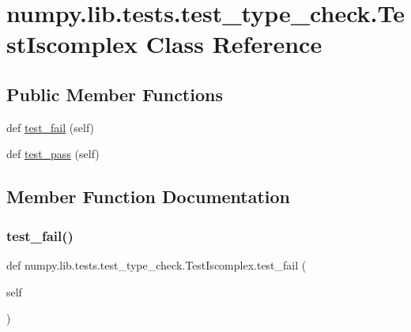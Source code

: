 \hypertarget{classnumpy_1_1lib_1_1tests_1_1test__type__check_1_1TestIscomplex}{}\section{numpy.\+lib.\+tests.\+test\+\_\+type\+\_\+check.\+Test\+Iscomplex Class Reference}
\label{classnumpy_1_1lib_1_1tests_1_1test__type__check_1_1TestIscomplex}
\subsection*{Public Member Functions}
\begin{DoxyCompactItemize}
\item 
def \hyperlink{classnumpy_1_1lib_1_1tests_1_1test__type__check_1_1TestIscomplex_ad9f2759d4bcd682f7aeb5766bb446afb}{test\+\_\+fail} (self)
\item 
def \hyperlink{classnumpy_1_1lib_1_1tests_1_1test__type__check_1_1TestIscomplex_afcdb92a141109563b0a023dba8e38e4f}{test\+\_\+pass} (self)
\end{DoxyCompactItemize}


\subsection{Member Function Documentation}
\mbox{\label{classnumpy_1_1lib_1_1tests_1_1test__type__check_1_1TestIscomplex_ad9f2759d4bcd682f7aeb5766bb446afb}} 
\subsubsection{\texorpdfstring{test\+\_\+fail()}{test\_fail()}}
{\footnotesize\ttfamily def numpy.\+lib.\+tests.\+test\+\_\+type\+\_\+check.\+Test\+Iscomplex.\+test\+\_\+fail (\begin{DoxyParamCaption}\item[{}]{self }\end{DoxyParamCaption})}

